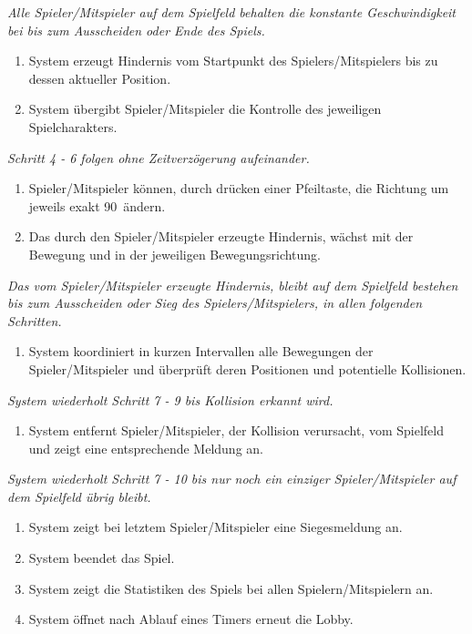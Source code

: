 \documentclass[11pt,ngerman]{article}
\begin{document}
\begin{tcolorbox}
    	\textit{Alle Spieler/Mitspieler auf dem Spielfeld behalten die konstante Geschwindigkeit bei bis zum Ausscheiden oder Ende des Spiels.}
    	\begin{enumerate}[resume]
    		\item System erzeugt Hindernis vom Startpunkt des Spielers/Mitspielers bis zu dessen aktueller Position.
    		\item System übergibt Spieler/Mitspieler die Kontrolle des jeweiligen Spielcharakters.
    	\end{enumerate}
    	\textit{Schritt 4 - 6 folgen ohne Zeitverzögerung aufeinander.}
    	\begin{enumerate}[resume]
    		\item Spieler/Mitspieler können, durch drücken einer Pfeiltaste, die Richtung um jeweils exakt 90\textdegree\ ändern.
    		\item Das durch den Spieler/Mitspieler erzeugte Hindernis, wächst mit der Bewegung und in der jeweiligen Bewegungsrichtung.
    	\end{enumerate}
    	\textit{Das vom Spieler/Mitspieler erzeugte Hindernis, bleibt auf dem Spielfeld bestehen bis zum Ausscheiden oder Sieg des Spielers/Mitspielers, in allen folgenden Schritten.}
    	\begin{enumerate}[resume]
    		\item System koordiniert in kurzen Intervallen alle Bewegungen der Spieler/Mitspieler und überprüft deren Positionen und potentielle Kollisionen.
    	\end{enumerate}
    	\textit{System wiederholt Schritt 7 - 9 bis Kollision erkannt wird.}
    	\begin{enumerate}[resume]
    		\item System entfernt Spieler/Mitspieler, der Kollision verursacht, vom Spielfeld und zeigt eine entsprechende Meldung an.
    	\end{enumerate}
    	\textit{System wiederholt Schritt 7 - 10 bis nur noch ein einziger Spieler/Mitspieler auf dem Spielfeld übrig bleibt.}
    	\begin{enumerate}[resume]
    		\item System zeigt bei letztem Spieler/Mitspieler eine Siegesmeldung an.
    		\item System beendet das Spiel.
    		\item System zeigt die Statistiken des Spiels bei allen Spielern/Mitspielern an.
    		\item System öffnet nach Ablauf eines Timers erneut die \Gls{Lobby}.
    	\end{enumerate}

    \end{tcolorbox}
\end{document}
